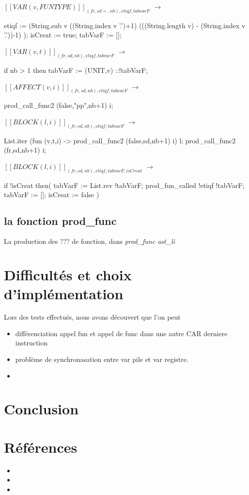 \documentclass[a4paper, 11pt]{report}
\begin{document}
$[\![ VAR(v,FUNTYPE) ]\!]
_{(fr,sd=,nb),etiqf,tabvarF} $
$\longrightarrow$
\begin{OCaml}
  etiqf := (String.sub v ((String.index v '.')+1) (((String.length v) - (String.index v '.'))-1) );
  isCreat := true;
  tabVarF := [];
\end{OCaml}

$[\![ VAR(v,t) ]\!]
_{(fr,sd,nb),etiqf,tabvarF} $
$\longrightarrow$
\begin{OCaml}
  if nb > 1 then
  tabVarF := (UNIT,v) ::!tabVarF;
\end{OCaml}

$[\![ AFFECT(v,i) ]\!]
_{(fr,sd,nb),etiqf,tabvarF} $
$\longrightarrow$
\begin{OCaml}
 prod\_call\_func2 (false,"pp",nb+1) i;
\end{OCaml}

$[\![ BLOCK(l,i) ]\!]
_{(fr,sd,nb),etiqf,tabvarF} $
$\longrightarrow$
\begin{OCaml}
  List.iter (fun (v,t,i) -> prod\_call\_func2 (false,sd,nb+1) i) l;
  prod\_call\_func2 (fr,sd,nb+1) i;
\end{OCaml}

$[\![ BLOCK(l,i) ]\!]
_{(fr,sd,nb),etiqf,tabvarF,isCreat} $
$\longrightarrow$
\begin{OCaml}
  if !isCreat then(
  tabVarF := List.rev !tabVarF;
  prod\_fun\_called !etiqf !tabVarF;
  tabVarF := [];
  isCreat := false
  )
\end{OCaml} 


\subsection{la fonction prod\_func}
La production des ??? de fonction, dans \emph{prod\_func ast\_li}


\section{Difficultés et choix d'implémentation}
Lors des tests effectués, nous avons découvert que l'on peut
\begin{itemize}
\item différenciation appel fun et appel de func dans une autre CAR
  derniere instruction 
\item problème de synchronasation entre var pile et var registre.
\item 
\end{itemize}

\section{Conclusion}

\section*{Références}
\begin{itemize}
\item 
\item 
\item 
\end{itemize}
\end{document}

